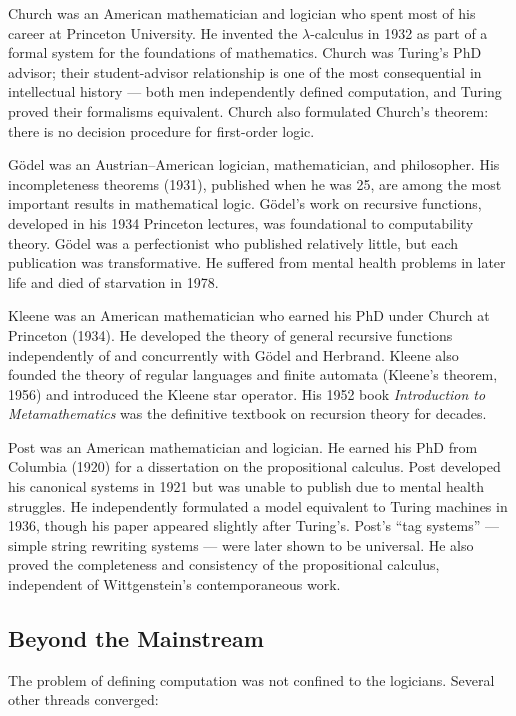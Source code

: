 Church was an American mathematician and logician who spent most of his career at Princeton University. He invented the $\lambda$-calculus in 1932 as part of a formal system for the foundations of mathematics. Church was Turing's PhD advisor; their student-advisor relationship is one of the most consequential in intellectual history --- both men independently defined computation, and Turing proved their formalisms equivalent. Church also formulated Church's theorem: there is no decision procedure for first-order logic.

G\"odel was an Austrian--American logician, mathematician, and philosopher. His incompleteness theorems (1931), published when he was 25, are among the most important results in mathematical logic. G\"odel's work on recursive functions, developed in his 1934 Princeton lectures, was foundational to computability theory. G\"odel was a perfectionist who published relatively little, but each publication was transformative. He suffered from mental health problems in later life and died of starvation in 1978.

Kleene was an American mathematician who earned his PhD under Church at Princeton (1934). He developed the theory of general recursive functions independently of and concurrently with G\"odel and Herbrand. Kleene also founded the theory of regular languages and finite automata (Kleene's theorem, 1956) and introduced the Kleene star operator. His 1952 book \emph{Introduction to Metamathematics} was the definitive textbook on recursion theory for decades.

Post was an American mathematician and logician. He earned his PhD from Columbia (1920) for a dissertation on the propositional calculus. Post developed his canonical systems in 1921 but was unable to publish due to mental health struggles. He independently formulated a model equivalent to Turing machines in 1936, though his paper appeared slightly after Turing's. Post's ``tag systems'' --- simple string rewriting systems --- were later shown to be universal. He also proved the completeness and consistency of the propositional calculus, independent of Wittgenstein's contemporaneous work.

\subsection*{Beyond the Mainstream}

The problem of defining computation was not confined to the logicians. Several other threads converged:

